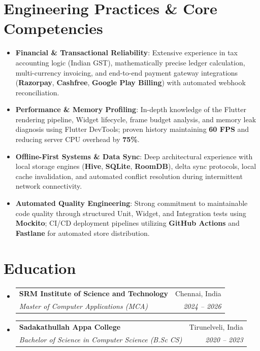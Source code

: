 \documentclass[letterpaper,10pt]{article}
\makeatletter
\newcommand{\resumeItem}[1]{
  \item\small{
    {#1 \vspace{-2pt}}
  }
}
\newcommand{\resumeSubheading}[4]{
  \vspace{-2pt}\item
    \begin{tabular*}{0.97\textwidth}[t]{l@{\extracolsep{\fill}}r}
      \textbf{#1} & #2 \\
      \textit{\small#3} & \textit{\small #4} \\
    \end{tabular*}\vspace{-5pt}
}
\newcommand{\resumeSubHeadingListStart}{\begin{itemize}[leftmargin=0.15in, label={}]}
\newcommand{\resumeSubHeadingListEnd}{\end{itemize}}
\makeatother
\begin{document}
\section{Engineering Practices \& Core Competencies}
\begin{itemize}[leftmargin=0.15in]
  \resumeItem{\textbf{Financial \& Transactional Reliability}: Extensive experience in tax accounting logic (Indian GST), mathematically precise ledger calculation, multi-currency invoicing, and end-to-end payment gateway integrations (\textbf{Razorpay}, \textbf{Cashfree}, \textbf{Google Play Billing}) with automated webhook reconciliation.}
  \resumeItem{\textbf{Performance \& Memory Profiling}: In-depth knowledge of the Flutter rendering pipeline, Widget lifecycle, frame budget analysis, and memory leak diagnosis using Flutter DevTools; proven history maintaining \textbf{60 FPS} and reducing server CPU overhead by \textbf{75\%}.}
  \resumeItem{\textbf{Offline-First Systems \& Data Sync}: Deep architectural experience with local storage engines (\textbf{Hive}, \textbf{SQLite}, \textbf{RoomDB}), delta sync protocols, local cache invalidation, and automated conflict resolution during intermittent network connectivity.}
  \resumeItem{\textbf{Automated Quality Engineering}: Strong commitment to maintainable code quality through structured Unit, Widget, and Integration tests using \textbf{Mockito}; CI/CD deployment pipelines utilizing \textbf{GitHub Actions} and \textbf{Fastlane} for automated store distribution.}
\end{itemize}

\section{Education}
  \resumeSubHeadingListStart
    \resumeSubheading
      {SRM Institute of Science and Technology}{Chennai, India}
      {Master of Computer Applications (MCA)}{2024 -- 2026}
    \resumeSubheading
      {Sadakathullah Appa College}{Tirunelveli, India}
      {Bachelor of Science in Computer Science (B.Sc CS)}{2020 -- 2023}
  \resumeSubHeadingListEnd

\end{document}
